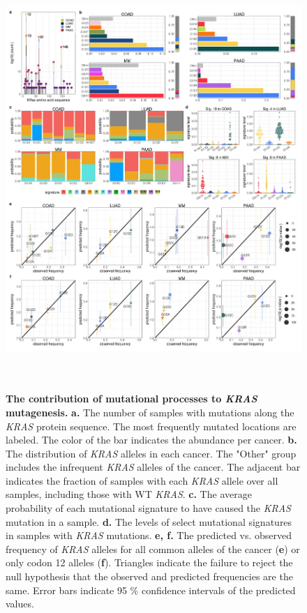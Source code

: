\documentclass[english, 10pt, letterpaper]{article}
\newcommand{\KRAS}{\emph{KRAS}}
\begin{document}

{}



\begin{figure}[p]
\centering
\includegraphics[height=160mm]{figures/Figure_01.jpeg}
\caption{
    \textbf{The contribution of mutational processes to \KRAS{} mutagenesis.}
    \textbf{a.} The number of samples with mutations along the \KRAS{} protein sequence. The most frequently mutated locations are labeled. The color of the bar indicates the abundance per cancer. 
    \textbf{b.} The distribution of \KRAS{} alleles in each cancer. The "Other" group includes the infrequent \KRAS{} alleles of the cancer. The adjacent bar indicates the fraction of samples with each \KRAS{} allele over all samples, including those with WT \KRAS{}.
    \textbf{c.} The average probability of each mutational signature to have caused the \KRAS{} mutation in a sample.
    \textbf{d.} The levels of select mutational signatures in samples with \KRAS{} mutations.
    \textbf{e, f.} The predicted vs. observed frequency of \KRAS{} alleles for all common alleles of the cancer (\textbf{e}) or only codon 12 alleles (\textbf{f}). Triangles indicate the failure to reject the null hypothesis that the observed and predicted frequencies are the same. Error bars indicate 95 \% confidence intervals of the predicted values.
}
\label{fig:mutational-signatures-main}
\end{figure}
\end{document}
